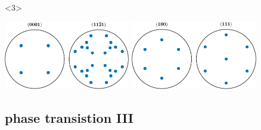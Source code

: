 \documentclass[compress]{beamer}
\begin{document}
\begin{frame}[fragile]
\begin{overlayarea}{\textwidth}{8cm}
\begin{onlyenv}<3>
  \begin{center}
    \includegraphics[height=3cm]{pic/HemPDF111.pdf}
    \quad
    \includegraphics[height=3cm]{pic/MagPDF110.pdf}
  \end{center}
\end{onlyenv}

\end{overlayarea}
\end{frame}


\subsection*{phase transistion III}
\end{document}
